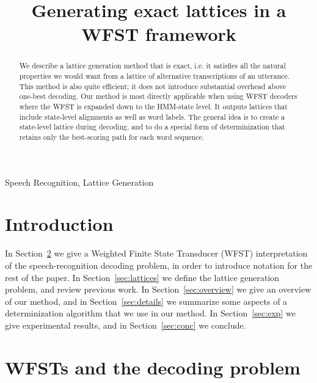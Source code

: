 \documentclass{article}
\title{Generating exact lattices in a WFST framework}
\begin{document}
\ninept  
%
\maketitle
%
\pagestyle{plain} %

\begin{abstract}
We describe a lattice generation method that is exact, i.e. it satisfies all the 
natural properties we would want from a lattice of alternative transcriptions of
an utterance.  This method is also quite efficient; it does not 
introduce substantial overhead above one-best decoding.  Our method is
most directly applicable when using WFST decoders where the WFST is
expanded down to the HMM-state level.  It outputs
lattices that include state-level alignments as well as word labels.
The general idea is to create a state-level lattice during decoding, and to do
a special form of determinization that retains only the best-scoring path
for each word sequence.
\end{abstract}

\begin{keywords}
  Speech Recognition, Lattice Generation
\end{keywords}

\section{Introduction}

In Section~\ref{sec:wfst} we give a Weighted Finite State Transducer
(WFST) interpretation of the speech-recognition decoding problem, in order
to introduce notation for the rest of the paper.  In Section~\ref{sec:lattices}
we define the lattice generation problem, and review previous work.
In Section~\ref{sec:overview} we give an overview of our method,
and in Section~\ref{sec:details} we summarize some aspects of a determinization
algorithm that we use in our method.  In Section~\ref{sec:exp} we give
experimental results, and in Section~\ref{sec:conc} we conclude.

\section{WFSTs and the decoding problem}
\label{sec:wfst}
\end{document}
